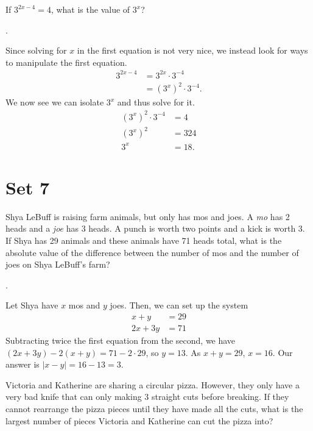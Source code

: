 \documentclass[11pt]{article}
\begin{document}
\begin{problem}If $3^{2x-4} = 4$, what is the value of $3^{x}$?
\end{problem}
\begin{answer}
.
\end{answer}
\begin{solution}
Since solving for $x$ in the first equation is not very nice, we instead look for ways to manipulate the first equation.
\begin{align*}
3^{2x-4} &= 3^{2x} \cdot 3^{-4} \\
&= (3^x)^2 \cdot 3^{-4}.
\end{align*}
We now see we can isolate  $3^{x}$ and thus solve for it.
\begin{align*}
(3^x)^2 \cdot 3^{-4} &= 4 \\
(3^x)^2 &= 324 \\
3^x &= \boxed{18}.
\end{align*}
\end{solution}

\eject

\section*{Set 7}

\begin{problem}  Shya LeBuff is raising farm animals, but only has mos and joes. A \emph{mo} has 2 heads and a \emph{joe} has 3 heads. A punch is worth two points and a kick is worth 3. If Shya has 29 animals and these animals have 71 heads total, what is the absolute value of the difference between the number of mos and the number of joes on Shya LeBuff's farm?
\end{problem}

\begin{answer} . \end{answer}
\begin{solution}
Let Shya have $x$ mos and $y$ joes. Then, we can set up the system
\begin{align*}
x + y &= 29 \\
2x + 3y &= 71
\end{align*}
Subtracting twice the first equation from the second, we have $(2x + 3y) - 2(x + y) = 71 - 2 \cdot 29$, so $y = 13$. As $x + y = 29$, $x = 16$. Our answer is $\left| x - y \right| = 16 - 13 = \boxed{3}$.
\end{solution}

\begin{problem} Victoria and Katherine are sharing a circular pizza. However, they only have a very bad knife that can only making 3 straight cuts before breaking. If they cannot rearrange the pizza pieces until they have made all the cuts, what is the largest number of pieces Victoria and Katherine can cut the pizza into?
\end{problem}
\end{document}
